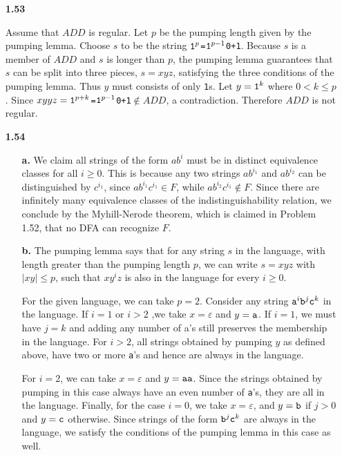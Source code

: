 \begin{enumerate}
    \item[{\bf 1.53}]
    
    Assume that $ADD$ is regular. Let $p$ be the pumping length given by the pumping lemma. Choose $s$ to be the string ${\tt 1}^p${\tt =}${\tt 1}^{p-1}${\tt 0+1}. Because $s$ is a member of $ADD$ and $s$ is longer than $p$, the pumping lemma guarantees that $s$ can be split into three pieces, $s=xyz$, satisfying the three conditions of the pumping lemma. Thus $y$ must consists of only {\tt 1}s. Let $y={\tt 1}^k$ where $0<k\le p$. Since $xyyz={\tt 1}^{p+k}${\tt =}${\tt 1}^{p-1}${\tt 0+1}$\notin ADD$, a contradiction. Therefore $ADD$ is not regular.
    
    \item[{\bf 1.54}]
    \begin{enumerate}
        \item[{\bf a.}] We claim all strings of the form $ab^i$ must be in distinct equivalence classes for all $i\ge 0$. This is because any two strings $ab^{i_1}$ and $ab^{i_2}$ can be distinguished by $c^{i_1}$, since $ab^{i_1}c^{i_1}\in F$, while $ab^{i_2}c^{i_1} \notin F$. Since there are infinitely many equivalence classes of the indistinguishability relation, we conclude by the Myhill-Nerode theorem, which is claimed in Problem 1.52, that no DFA can recognize $F$.
        
        \item[{\bf b.}] The pumping lemma says that for any string $s$ in the language, with length greater than the pumping length $p$, we can write $s = xyz$ with $|xy|\le p$, such that $xy^iz$ is also in the language for every $i\ge 0$.
        
        For the given language, we can take $p = 2$. Consider any string ${\tt a}^i{\tt b}^j{\tt c}^k$ in the language. If $i=1$ or $i>2$ ,we take $x=\varepsilon$ and $y={\tt a}$. If $i=1$, we must have $j=k$ and adding any number of a’s still preserves the membership in the language. For $i > 2$, all strings obtained by pumping $y$ as defined above, have two or more \texttt{a}’s and hence are always in the language.
        
        For $i = 2$, we can take $x = \varepsilon$ and $y = {\tt aa}$. Since the strings obtained by pumping in this case always have an even number of \texttt{a}’s, they are all in the language. Finally, for the case $i=0$, we take $x=\varepsilon$, and $y={\tt b}$ if $j>0$ and $y={\tt c}$ otherwise. Since strings of the form ${\tt b}^j{\tt c}^k$ are always in the language, we satisfy the conditions of the pumping lemma in this case as well.
        

\end{enumerate}
\end{enumerate}
